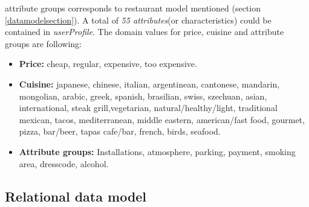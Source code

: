 attribute groups corresponds to restaurant model mentioned (section
\ref{datamodelsection}). A total of \textit{55 attributes}(or characteristics) 
could be contained in \textit{userProfile}. The domain values for price, 
cuisine and attribute groups are following:
\begin{itemize}
\item \textbf{Price:} cheap, regular, expensive, too expensive.
\item \textbf{Cuisine:} japanese, chinese, italian, argentinean,
cantonese, mandarin, mongolian, arabic, greek, spanish, brasilian,
swiss, szechuan, asian, international, steak grill,vegetarian,
natural/healthy/light, traditional mexican, tacos, mediterranean,
middle eastern, american/fast food, gourmet, pizza, bar/beer, tapas
cafe/bar, french, birds, seafood.
\item  \textbf{Attribute groups:} Installations, atmosphere, 
parking, payment, smoking area, dresscode, alcohol.
\end{itemize}

\subsection{Relational data model} 

